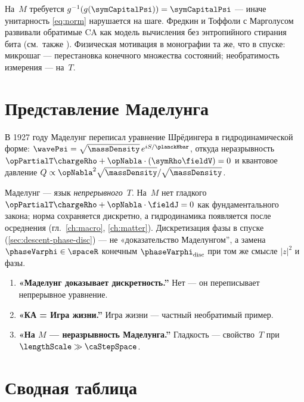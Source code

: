 На~$M$ требуется $g^{-1}(g(\symCapitalPsi))=\symCapitalPsi$ --- иначе унитарность \eqref{eq:norm} нарушается на шаге.
Фредкин \cite{fredkin1990} и Тоффоли с Марголусом \cite{toffoli1987} развивали обратимые CA
как модель вычисления без энтропийного стирания бита (см.\ также \cite{bennett1973,landauer1961}).
Физическая мотивация в монографии та же, что в спуске:
микрошаг --- перестановка конечного множества состояний; необратимость измерения --- на~$T$.

\section{Представление Маделунга}

В 1927 году Маделунг \cite{madelung1927} переписал уравнение Шрёдингера в гидродинамической форме:
$\wavePsi=\sqrt{\massDensity}\,e^{iS/\planckHbar}$, откуда неразрывность $\opPartialT\chargeRho+\opNabla\cdot(\symRho\fieldV)=0$
и квантовое давление $Q\propto\opNabla^2\sqrt{\massDensity}/\sqrt{\massDensity}$.

Маделунг --- язык \emph{непрерывного}~$T$.
На~$M$ нет гладкого $\opPartialT\chargeRho+\opNabla\cdot\fieldJ=0$ как фундаментального закона;
норма сохраняется дискретно, а гидродинамика появляется после осреднения
(гл.~\ref{ch:macro}, \ref{ch:matter}).
Дискретизация фазы в спуске (\cref{sec:descent-phase-disc}) --- не «доказательство Маделунгом'',
а замена $\phaseVarphi\in\spaceR$ конечным $\phaseVarphi_{\mathrm{disc}}$ при том же смысле $|z|^2$ и фазы.

\begin{remark}
\begin{enumerate}
\item \textbf{«Маделунг доказывает дискретность.''} Нет --- он переписывает непрерывное уравнение.
\item \textbf{«КА = Игра жизни.''} Игра жизни --- частный необратимый пример.
\item \textbf{«На $M$ --- неразрывность Маделунга.''} Гладкость --- свойство~$T$ при $\lengthScale\gg\caStepSpace$.
\end{enumerate}
\end{remark}

\section{Сводная таблица}


